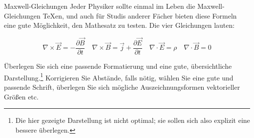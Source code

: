\documentclass[
	vorläufig=false, 
	blattnr=2,
	ausgabe=2016-11-04,
	abgabe=2016-11-11,
	shortverb,
]{../tex/latexkurs-exercise}
\begin{document}
\begin{aufgabe}[6]{Maxwell-Gleichungen}
	Jeder Physiker sollte einmal im Leben die Maxwell-Gleichungen \TeX{}en, und auch für Studis anderer Fächer bieten diese Formeln eine gute Möglichkeit, den Mathesatz zu testen. Die vier Gleichungen lauten:                                                                                                           
                                                                                                                                                                                                                                                                                                                               
        \[\textstyle \nabla \times \vec E = -\frac{\partial \vec B}{\partial t}\quad \nabla \times \vec B = \vec j + \frac{\partial \vec E}{\partial t}\quad \nabla \cdot \vec E = \rho\quad                                                                                                                                   
        \nabla \cdot \vec B = 0\]                                                                                                                                                                                                                                                                                              
                                                                                                                                                                                                                                                                                                                               
   \noindent Überlegen Sie sich eine passende Formatierung und eine gute, übersichtliche Darstellung.\footnote{Die hier gezeigte Darstellung ist nicht optimal; sie sollen sich also explizit eine bessere überlegen.} Korrigieren Sie Abstände, falls nötig, wählen Sie eine gute und passende Schrift, überlegen Sie sich mögliche Auszeichnungsformen vektorieller Größen etc.                                                                                                                                                                                                                                                                       
                                                                                                                                                                                                                                                                                                                               

\end{aufgabe}
\end{document}

